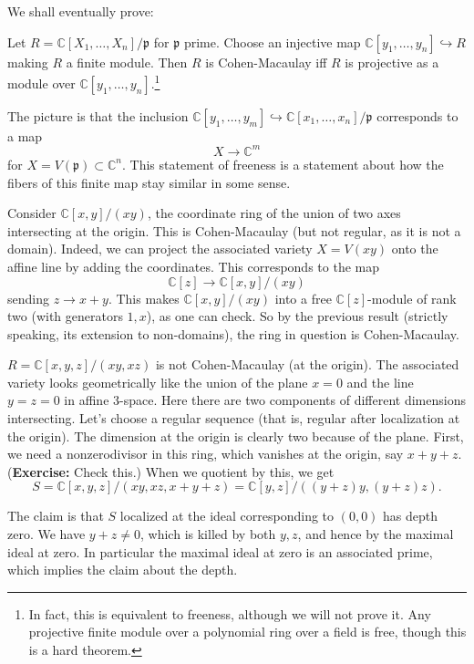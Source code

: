 We shall eventually prove:

\begin{proposition} 
Let $R = \mathbb{C}[X_1, \dots, X_n]/\mathfrak{p}$ for
$\mathfrak{p}$ prime.
Choose an injective map $\mathbb{C}[y_1, \dots, y_n]
\hookrightarrow R$ making $R$ a
finite module. Then $R$ is Cohen-Macaulay iff $R$ is projective
as a module
over $\mathbb{C}[y_1, \dots, y_n]$.\footnote{In fact, this is
equivalent to
freeness, although we will not prove it. Any projective finite
module over a
polynomial ring over a field is free, though this is a hard
theorem.}
\end{proposition} 

The picture is that the inclusion $\mathbb{C}[y_1, \dots, y_m ]
\hookrightarrow
\mathbb{C}[x_1, \dots, x_n]/\mathfrak{p}$ corresponds to a map 
\[ X \to \mathbb{C}^m  \]
for $X = V(\mathfrak{p}) \subset \mathbb{C}^n$. This statement
of freeness is a
statement about how the fibers of this finite map stay similar
in some sense.

\begin{example} 
Consider $\mathbb{C}[x,y]/(xy)$, the coordinate ring of the
union of two axes
intersecting at the origin. This is Cohen-Macaulay (but not
regular, as it
is not a domain). Indeed, we can project the associated variety
$X = V(xy)$
onto the affine line by adding the coordinates. This corresponds
to the map
\[ \mathbb{C}[z] \to \mathbb{C}[x,y]/(xy)  \]
sending $z \to x+y$. This makes $\mathbb{C}[x,y]/(xy)$ into a
free
$\mathbb{C}[z]$-module of rank two (with generators $1, x$), as
one can check.
So by the previous result (strictly speaking, its extension to
non-domains),
the ring in question is Cohen-Macaulay.
\end{example} 

\begin{example} 
$R=\mathbb{C}[x,y,z]/(xy, xz)$ is not Cohen-Macaulay (at the
origin). The associated variety looks
geometrically like the union of the plane $x=0$ and the line
$y=z=0$ in affine
3-space. Here there are two components of different dimensions
intersecting.
Let's choose a regular sequence (that is, regular after
localization at the
origin). The dimension at the origin is clearly two because of
the plane.
First, we need a nonzerodivisor in this ring, which vanishes at
the origin, say
$ x+y+z$. (\textbf{Exercise:} Check this.) When we quotient by
this, we get
\[ S=\mathbb{C}[x,y,z]/(xy,xz, x+y+z) = \mathbb{C}[y,z]/(
(y+z)y, (y+z)z). \]

The claim is that $S$ localized at the ideal corresponding to
$(0,0)$ has depth
zero. We have $y+z \neq 0$, which is killed by both $y,z$, and
hence by the
maximal ideal at zero. In particular the maximal ideal at zero
is an associated
prime, which implies the claim about the depth.
\end{example} 

